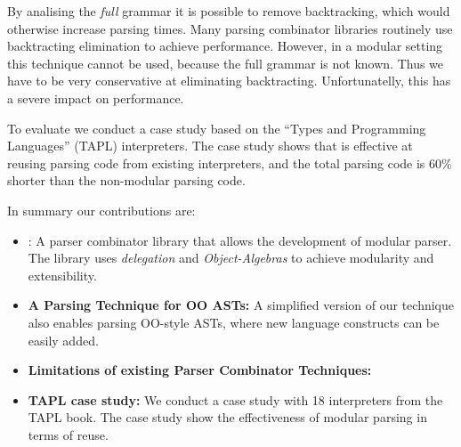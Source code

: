   By analising the \emph{full} grammar it is possible to remove
  backtracking, which would otherwise increase parsing times. Many
  parsing combinator libraries routinely use backtracting elimination
  to achieve performance. However, in a modular setting this technique
  cannot be used, because the full grammar is not known. Thus we have
  to be very conservative at eliminating backtracting. Unfortunatelly,
  this has a severe impact on performance.

  To evaluate \name we conduct a case study based on the ``Types and
  Programming Languages'' (TAPL) interpreters.  The case study shows
  that \name is effective at reusing parsing code from existing
  interpreters, and the total parsing code is 60\% shorter than the
  non-modular parsing code.

In summary our contributions are:

\begin{itemize}

\item {\name:} A parser combinator library that allows the development 
of modular parser. The library uses \emph{delegation} and
\emph{Object-Algebras} to achieve modularity and extensibility.

\item {{\bf A Parsing Technique for OO ASTs:}} A simplified version of
  our technique also enables parsing OO-style ASTs, where new language
  constructs can be easily added.

\item {{\bf Limitations of existing Parser Combinator Techniques:}}

\item {{\bf TAPL case study:}} We conduct a case study with 18 interpreters
  from the TAPL book. The case study show the effectiveness of modular 
  parsing in terms of reuse.

\end{itemize}



